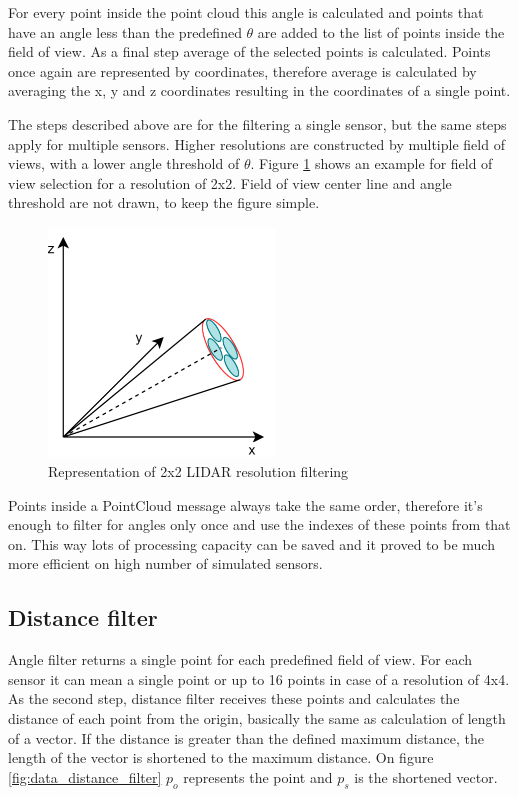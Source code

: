 For every point inside the point cloud this angle is calculated and points that have an angle less than the 
predefined $\theta$ are added to the list of points inside the field of view. As a final step average of the 
selected points is calculated. Points once again are represented by coordinates, therefore average is calculated 
by averaging the x, y and z coordinates resulting in the coordinates of a single point.

The steps described above are for the filtering a single sensor, but the same steps apply for multiple 
sensors. Higher resolutions are constructed by multiple field of views, with a lower angle threshold of 
$\theta$. Figure \ref{fig:data_angle_filter_high_res} shows an example for field of view selection for 
a resolution of 2x2. Field of view center line and angle threshold are not drawn, to keep the figure simple. 

\begin{figure}[!ht]
    \centering
    \includegraphics[width=60mm, keepaspectratio]{figures/data_angle_filter_high_res.png}
    \caption{Representation of 2x2 LIDAR resolution filtering}
    \label{fig:data_angle_filter_high_res}
\end{figure}

Points inside a PointCloud message always take the same order, therefore it's enough to filter 
for angles only once and use the indexes of these points from that on. This way lots of processing capacity
can be saved and it proved to be much more efficient on high number of simulated sensors.


\subsection{Distance filter}
Angle filter returns a single point for each predefined field of view. For each sensor it can mean a single 
point or up to 16 points in case of a resolution of 4x4. As the second step, distance filter receives these 
points and calculates the distance of each point from the origin, basically the same as calculation of length
of a vector. If the distance is greater than the defined maximum distance, the length of the vector
is shortened to the maximum distance. On figure \ref{fig:data_distance_filter} $p_{o}$ represents the 
point and $p_{s}$ is the shortened vector.

